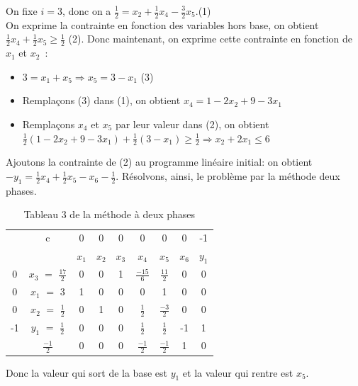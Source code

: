On fixe $i = 3$, donc on a $\frac{1}{2} = x_{2} + \frac{1}{2} x_{4} - \frac{3}{2} x_{5}$.(1)\\
On exprime la contrainte en fonction des variables hors base, on obtient $\frac{1}{2} x_{4} + \frac{1}{2} x_{5} \geqslant \frac{1}{2}$ (2). Donc maintenant, on exprime cette contrainte en fonction de $x_{1}$ et $x_{2}$~:
\begin{itemize}
\item $3 = x_{1} + x_{5} \Longrightarrow x_{5} = 3 - x_{1}$ (3)
\item Remplaçons (3) dans (1), on obtient $x_{4} = 1 - 2x_{2} + 9 - 3x_{1}$
\item Remplaçons $x_{4}$ et $x_{5}$ par leur valeur dans (2), on obtient $\frac{1}{2}(1 - 2x_{2} + 9 - 3x_{1}) + \frac{1}{2} (3 - x_{1}) \geqslant \frac{1}{2} \Longrightarrow x_{2} + 2x_{1} \leqslant 6$ 
\end{itemize}
Ajoutons la contrainte de (2) au programme linéaire initial: on obtient $-y_{1} = \frac{1}{2}x_{4} + \frac{1}{2}x_{5} - x_{6} - \frac{1}{2}$. Résolvons, ainsi, le problème par la méthode deux phases.\\
\begin{table}
\centering
\begin{tabular}{|c|c|c|c|c|c|c|c|c|}
	\hline
      & c & 0 & 0 & 0 & 0 & 0 & 0 & -1 \\ 
      \cline{2-9}
       &  & $x_{1}$ & $x_{2}$  & $x_{3}$  & $x_{4}$ & $x_{5}$ & $x_{6}$ & $y_{1}$ \\
       \hline
   0 & $x_{3}$  $=$ $\frac{17}{2}$ & 0 & 0 & 1 & $\frac{-15}{6}$ & $\frac{11}{2}$ & 0 & 0 \\
      \hline
	0 & $x_{1}$ $=$ 3 & 1 & 0 & 0 & 0 & 1 & 0 & 0 \\
	  \hline
	0 & $x_{2}$ $=$ $\frac{1}{2}$  & 0 & 1 & 0 & $\frac{1}{2}$ & $\frac{-3}{2}$ & 0 & 0\\
	  \hline
	-1 & $y_{1}$ $=$ $\frac{1}{2}$  & 0 & 0 & 0 & $\frac{1}{2}$ & $\frac{1}{2}$ & -1 & 1\\
	  \hline
	 & $\frac{-1}{2}$ & 0 & 0 & 0 & $\frac{-1}{2}$ & $\frac{-1}{2}$ & 1 & 0\\
	  \hline
	\end{tabular}
\caption{Tableau 3 de la méthode à deux phases}
\end{table}
Donc la valeur qui sort de la base est $y_{1}$ et la valeur qui rentre est $x_{5}$.
